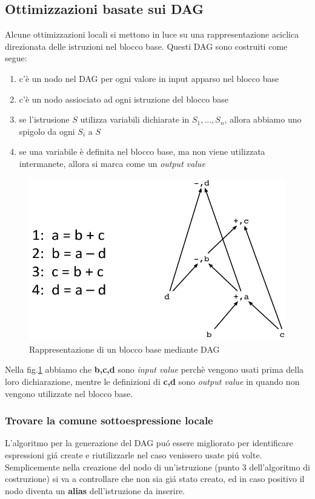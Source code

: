 \subsection{Ottimizzazioni basate sui DAG}
Alcune ottimizzazioni locali si mettono in luce su una rappresentazione
aciclica direzionata delle istruzioni nel blocco base. Questi DAG sono
costruiti come segue:
\begin{enumerate}
\item c'\`e un nodo nel DAG per ogni valore in input apparso nel blocco base
\item c'\`e un nodo assiociato ad ogni istruzione del blocco base
\item se l'istrusione $S$ utilizza variabili dichiarate in $S_1,...,S_n$,
allora abbiamo uno spigolo da ogni $S_i$ a $S$
\item se una variabile \`e definita nel blocco base, ma non viene utilizzata
intermanete, allora si marca come un \textit{output value}
\end{enumerate}

\begin{figure}[H]
  \centering
  \includegraphics[scale=0.4]{res/image/dag_block}
  \caption{Rappresentazione di un blocco base mediante DAG}
  \label{img:dag_block}
\end{figure}

Nella fig.\ref{img:dag_block} abbiamo che \textbf{b,c,d} sono \textit{input
value} perch\`e vengono usati prima della loro dichiarazione, mentre le
definizioni di \textbf{c,d} sono \textit{output value} in quando non vengono
utilizzate nel blocco base.

\subsubsection{Trovare la comune sottoespressione locale}
\label{sec:common_subexpression}
L'algoritmo per la generazione del DAG pu\'o essere migliorato per identificare
espressioni gi\'a create e riutilizzarle nel caso venissero usate pi\'u volte.
Semplicemente nella creazione del nodo di un'istruzione (punto 3 dell'algoritmo
di costruzione) si va a controllare che non sia gi\'a stato creato, ed in caso
positivo il nodo diventa un \textbf{alias} dell'istruzione da inserire.


